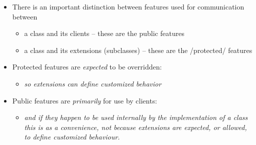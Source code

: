 \documentclass{ip3}
\begin{document}
\begin{foil}
\begin{itemize}
\item There is an important distinction between features used for
communication between 
\begin{itemize}
\item a class and its clients     -- these are the public features
\item a class and its extensions (subclasses)  -- these are the \sc/protected/ features
\end{itemize}

\item Protected features are \textit{expected} to be overridden: 
      \begin{itemize}\item[]
            \textit{so extensions can  define customized behavior}
      \end{itemize}

\item Public features are \textit{primarily} for use by clients:

     \begin{itemize}\item[]
           \textit{and if they happen to be used internally by the implementation of a class
           this is as a convenience, not because extensions are expected, or allowed, to
           define customized behaviour.}
      \end{itemize}
          
\end{itemize}
\end{foil}
\end{document}
